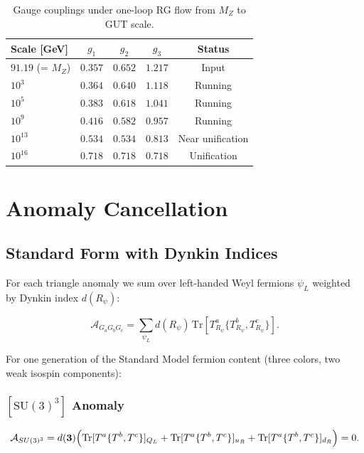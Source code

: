 \documentclass[11pt]{article}
\begin{document}
\begin{table}[htbp]
\centering
\caption{Gauge couplings under one-loop RG flow
from $M_Z$ to GUT scale.}
\label{tab:rg_running}
\begin{tabular}{@{}lcccc@{}}
\toprule
Scale [GeV] & $g_1$ & $g_2$ & $g_3$ & Status \\
\midrule
$91.19$ (= $M_Z$) & $0.357$ & $0.652$ & $1.217$ & Input \\
$10^3$            & $0.364$ & $0.640$ & $1.118$ & Running \\
$10^5$            & $0.383$ & $0.618$ & $1.041$ & Running \\
$10^9$            & $0.416$ & $0.582$ & $0.957$ & Running \\
$10^{13}$         & $0.534$ & $0.534$ & $0.813$ & Near unification \\
$10^{16}$         & $0.718$ & $0.718$ & $0.718$ & Unification \\
\bottomrule
\end{tabular}
\end{table}

\section{Anomaly Cancellation}
\label{sec:anomaly}

\subsection{Standard Form with Dynkin Indices}

For each triangle anomaly we sum over left-handed Weyl fermions
$\psi_L$ weighted by Dynkin index $d(R_\psi)$:

\begin{equation}
  \mathcal{A}_{G_a G_b G_c}
  = \sum_{\psi_L} d(R_\psi)\,
    \mathrm{Tr}\!\left[T^a_{R_\psi}\{T^b_{R_\psi},T^c_{R_\psi}\}\right].
\end{equation}

For one generation of the Standard Model fermion content
(three colors, two weak isospin components):

\subsubsection{$[\mathrm{SU}(3)^3]$ Anomaly}

\begin{equation}
  \mathcal{A}_{SU(3)^3}
  = d(\mathbf{3})\Bigl(
      \mathrm{Tr}[T^a\{T^b,T^c\}]_{Q_L}
    + \mathrm{Tr}[T^a\{T^b,T^c\}]_{u_R}
    + \mathrm{Tr}[T^a\{T^b,T^c\}]_{d_R}
    \Bigr) = 0.
\end{equation}
\end{document}

